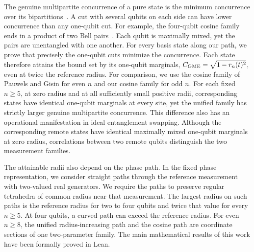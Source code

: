 The genuine multipartite concurrence of a pure state is the minimum concurrence over its bipartitions~\cite{Ma2011}. A cut with several qubits on each side can have lower concurrence than any one-qubit cut. For example, the four-qubit cosine family ends in a product of two Bell pairs~\cite{PauwelsGisin2026}. Each qubit is maximally mixed, yet the pairs are unentangled with one another. For every basis state along our path, we prove that precisely the one-qubit cuts minimize the concurrence. Each state therefore attains the bound set by its one-qubit marginals, $C_{\rm GME}=\sqrt{1-r_n(t)^2}$, even at twice the reference radius. For comparison, we use the cosine family of Pauwels and Gisin for even $n$ and our cosine family for odd $n$. For each fixed $n\ge5$, at zero radius and at all sufficiently small positive radii, corresponding states have identical one-qubit marginals at every site, yet the unified family has strictly larger genuine multipartite concurrence. This difference also has an operational manifestation in ideal entanglement swapping. Although the corresponding remote states have identical maximally mixed one-qubit marginals at zero radius, correlations between two remote qubits distinguish the two measurement families.

The attainable radii also depend on the phase path. In the fixed phase representation, we consider straight paths through the reference measurement with two-valued real generators. We require the paths to preserve regular tetrahedra of common radius near that measurement. The largest radius on such paths is the reference radius for two to four qubits and twice that value for every $n\ge5$. At four qubits, a curved path can exceed the reference radius. For even $n\ge8$, the unified radius-increasing path and the cosine path are coordinate sections of one two-parameter family. The main mathematical results of this work have been formally proved in Lean.
